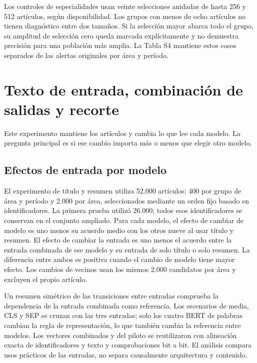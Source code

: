 \documentclass[12pt]{article}
\begin{document}
Los controles de especialidades usan veinte selecciones anidadas de hasta 256 y 512 artículos, según disponibilidad. Los grupos con menos de ocho artículos no tienen diagnóstico entre dos tamaños. Si la selección mayor abarca todo el grupo, su amplitud de selección cero queda marcada explícitamente y no demuestra precisión para una población más amplia. La Tabla S4 mantiene estos casos separados de las alertas originales por área y período.

\FloatBarrier

\section{Texto de entrada, combinación de salidas y recorte}
Este experimento mantiene los artículos y cambia lo que lee cada modelo. La pregunta principal es si ese cambio importa más o menos que elegir otro modelo.

\subsection{Efectos de entrada por modelo}
El experimento de título y resumen utiliza 52.000 artículos: 400 por grupo de área y período y 2.000 por área, seleccionados mediante un orden fijo basado en identificadores. La primera prueba utilizó 26.000; todos esos identificadores se conservan en el conjunto ampliado. Para cada modelo, el efecto de cambiar de modelo es uno menos su acuerdo medio con los otros nueve al usar título y resumen. El efecto de cambiar la entrada es uno menos el acuerdo entre la entrada combinada de ese modelo y su entrada de solo título o solo resumen. La diferencia entre ambos es positiva cuando el cambio de modelo tiene mayor efecto. Los cambios de vecinos usan los mismos 2.000 candidatos por área y excluyen el propio artículo.

Un resumen simétrico de las transiciones entre entradas comprueba la dependencia de la entrada combinada como referencia. Los escenarios de media, CLS y SEP se cruzan con las tres entradas; solo los cuatro BERT de palabras cambian la regla de representación, lo que también cambia la referencia entre modelos. Los vectores combinados y del piloto se reutilizaron con alineación exacta de identificadores y texto y comprobaciones bit a bit. El análisis compara usos prácticos de las entradas, no separa causalmente arquitectura y contenido.

\FloatBarrier
\end{document}
